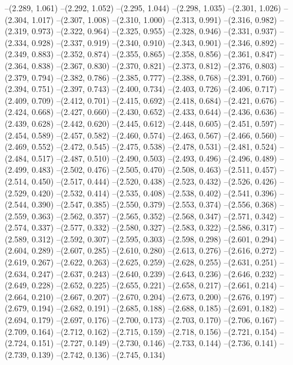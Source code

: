 {--(2.289, 1.061)
--(2.292, 1.052)
--(2.295, 1.044)
--(2.298, 1.035)
--(2.301, 1.026)
--(2.304, 1.017)
--(2.307, 1.008)
--(2.310, 1.000)
--(2.313, 0.991)
--(2.316, 0.982)
--(2.319, 0.973)
--(2.322, 0.964)
--(2.325, 0.955)
--(2.328, 0.946)
--(2.331, 0.937)
--(2.334, 0.928)
--(2.337, 0.919)
--(2.340, 0.910)
--(2.343, 0.901)
--(2.346, 0.892)
--(2.349, 0.883)
--(2.352, 0.874)
--(2.355, 0.865)
--(2.358, 0.856)
--(2.361, 0.847)
--(2.364, 0.838)
--(2.367, 0.830)
--(2.370, 0.821)
--(2.373, 0.812)
--(2.376, 0.803)
--(2.379, 0.794)
--(2.382, 0.786)
--(2.385, 0.777)
--(2.388, 0.768)
--(2.391, 0.760)
--(2.394, 0.751)
--(2.397, 0.743)
--(2.400, 0.734)
--(2.403, 0.726)
--(2.406, 0.717)
--(2.409, 0.709)
--(2.412, 0.701)
--(2.415, 0.692)
--(2.418, 0.684)
--(2.421, 0.676)
--(2.424, 0.668)
--(2.427, 0.660)
--(2.430, 0.652)
--(2.433, 0.644)
--(2.436, 0.636)
--(2.439, 0.628)
--(2.442, 0.620)
--(2.445, 0.612)
--(2.448, 0.605)
--(2.451, 0.597)
--(2.454, 0.589)
--(2.457, 0.582)
--(2.460, 0.574)
--(2.463, 0.567)
--(2.466, 0.560)
--(2.469, 0.552)
--(2.472, 0.545)
--(2.475, 0.538)
--(2.478, 0.531)
--(2.481, 0.524)
--(2.484, 0.517)
--(2.487, 0.510)
--(2.490, 0.503)
--(2.493, 0.496)
--(2.496, 0.489)
--(2.499, 0.483)
--(2.502, 0.476)
--(2.505, 0.470)
--(2.508, 0.463)
--(2.511, 0.457)
--(2.514, 0.450)
--(2.517, 0.444)
--(2.520, 0.438)
--(2.523, 0.432)
--(2.526, 0.426)
--(2.529, 0.420)
--(2.532, 0.414)
--(2.535, 0.408)
--(2.538, 0.402)
--(2.541, 0.396)
--(2.544, 0.390)
--(2.547, 0.385)
--(2.550, 0.379)
--(2.553, 0.374)
--(2.556, 0.368)
--(2.559, 0.363)
--(2.562, 0.357)
--(2.565, 0.352)
--(2.568, 0.347)
--(2.571, 0.342)
--(2.574, 0.337)
--(2.577, 0.332)
--(2.580, 0.327)
--(2.583, 0.322)
--(2.586, 0.317)
--(2.589, 0.312)
--(2.592, 0.307)
--(2.595, 0.303)
--(2.598, 0.298)
--(2.601, 0.294)
--(2.604, 0.289)
--(2.607, 0.285)
--(2.610, 0.280)
--(2.613, 0.276)
--(2.616, 0.272)
--(2.619, 0.267)
--(2.622, 0.263)
--(2.625, 0.259)
--(2.628, 0.255)
--(2.631, 0.251)
--(2.634, 0.247)
--(2.637, 0.243)
--(2.640, 0.239)
--(2.643, 0.236)
--(2.646, 0.232)
--(2.649, 0.228)
--(2.652, 0.225)
--(2.655, 0.221)
--(2.658, 0.217)
--(2.661, 0.214)
--(2.664, 0.210)
--(2.667, 0.207)
--(2.670, 0.204)
--(2.673, 0.200)
--(2.676, 0.197)
--(2.679, 0.194)
--(2.682, 0.191)
--(2.685, 0.188)
--(2.688, 0.185)
--(2.691, 0.182)
--(2.694, 0.179)
--(2.697, 0.176)
--(2.700, 0.173)
--(2.703, 0.170)
--(2.706, 0.167)
--(2.709, 0.164)
--(2.712, 0.162)
--(2.715, 0.159)
--(2.718, 0.156)
--(2.721, 0.154)
--(2.724, 0.151)
--(2.727, 0.149)
--(2.730, 0.146)
--(2.733, 0.144)
--(2.736, 0.141)
--(2.739, 0.139)
--(2.742, 0.136)
--(2.745, 0.134)
}
